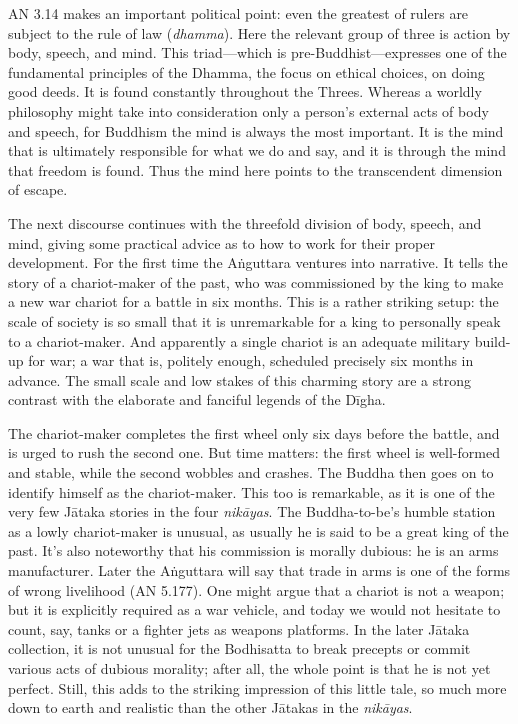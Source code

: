 \documentclass[12pt,openany]{book}%
\begin{document}
AN 3.14 makes an important political point: even the greatest of rulers are subject to the rule of law (\textit{dhamma}). Here the relevant group of three is action by body, speech, and mind. This triad—which is pre-Buddhist—expresses one of the fundamental principles of the Dhamma, the focus on ethical choices, on doing good deeds. It is found constantly throughout the Threes. Whereas a worldly philosophy might take into consideration only a person’s external acts of body and speech, for Buddhism the mind is always the most important. It is the mind that is ultimately responsible for what we do and say, and it is through the mind that freedom is found. Thus the mind here points to the transcendent dimension of escape.

The next discourse continues with the threefold division of body, speech, and mind, giving some practical advice as to how to work for their proper development. For the first time the \textsanskrit{Aṅguttara} ventures into narrative. It tells the story of a chariot-maker of the past, who was commissioned by the king to make a new war chariot for a battle in six months. This is a rather striking setup: the scale of society is so small that it is unremarkable for a king to personally speak to a chariot-maker. And apparently a single chariot is an adequate military build-up for war; a war that is, politely enough, scheduled precisely six months in advance. The small scale and low stakes of this charming story are a strong contrast with the elaborate and fanciful legends of the \textsanskrit{Dīgha}.

The chariot-maker completes the first wheel only six days before the battle, and is urged to rush the second one. But time matters: the first wheel is well-formed and stable, while the second wobbles and crashes. The Buddha then goes on to identify himself as the chariot-maker. This too is remarkable, as it is one of the very few \textsanskrit{Jātaka} stories in the four \textit{\textsanskrit{nikāyas}}. The Buddha-to-be’s humble station as a lowly chariot-maker is unusual, as usually he is said to be a great king of the past. It’s also noteworthy that his commission is morally dubious: he is an arms manufacturer. Later the \textsanskrit{Aṅguttara} will say that trade in arms is one of the forms of wrong livelihood (AN 5.177). One might argue that a chariot is not a weapon; but it is explicitly required as a war vehicle, and today we would not hesitate to count, say, tanks or a fighter jets as weapons platforms. In the later \textsanskrit{Jātaka} collection, it is not unusual for the Bodhisatta to break precepts or commit various acts of dubious morality; after all, the whole point is that he is not yet perfect. Still, this adds to the striking impression of this little tale, so much more down to earth and realistic than the other \textsanskrit{Jātakas} in the \textit{\textsanskrit{nikāyas}}.
\end{document}
